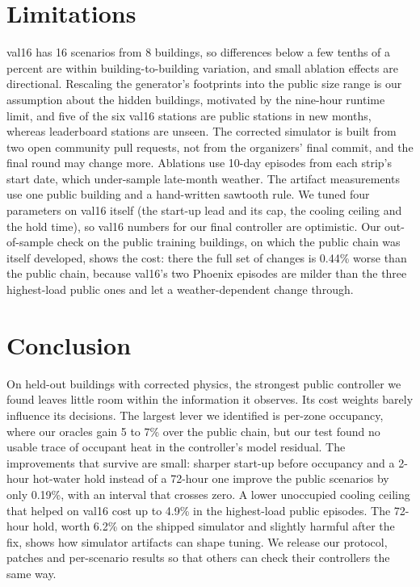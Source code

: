\documentclass{article}
\begin{document}
\section{Limitations}
val16 has 16 scenarios from 8 buildings, so differences below a few tenths of a percent are within building-to-building variation, and small ablation effects are directional. Rescaling the generator's footprints into the public size range is our assumption about the hidden buildings, motivated by the nine-hour runtime limit, and five of the six val16 stations are public stations in new months, whereas leaderboard stations are unseen. The corrected simulator is built from two open community pull requests, not from the organizers' final commit, and the final round may change more. Ablations use 10-day episodes from each strip's start date, which under-sample late-month weather. The artifact measurements use one public building and a hand-written sawtooth rule. We tuned four parameters on val16 itself (the start-up lead and its cap, the cooling ceiling and the hold time), so val16 numbers for our final controller are optimistic. Our out-of-sample check on the public training buildings, on which the public chain was itself developed, shows the cost: there the full set of changes is 0.44\% worse than the public chain, because val16's two Phoenix episodes are milder than the three highest-load public ones and let a weather-dependent change through.

\section{Conclusion}
On held-out buildings with corrected physics, the strongest public controller we found leaves little room within the information it observes. Its cost weights barely influence its decisions. The largest lever we identified is per-zone occupancy, where our oracles gain 5 to 7\% over the public chain, but our test found no usable trace of occupant heat in the controller's model residual. The improvements that survive are small: sharper start-up before occupancy and a 2-hour hot-water hold instead of a 72-hour one improve the public scenarios by only 0.19\%, with an interval that crosses zero. A lower unoccupied cooling ceiling that helped on val16 cost up to 4.9\% in the highest-load public episodes. The 72-hour hold, worth 6.2\% on the shipped simulator and slightly harmful after the fix, shows how simulator artifacts can shape tuning. We release our protocol, patches and per-scenario results so that others can check their controllers the same way.
\end{document}
